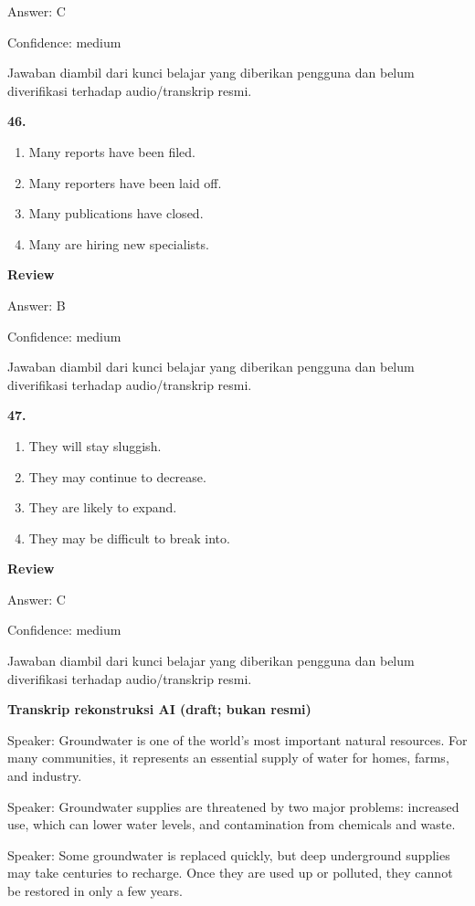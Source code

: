 \documentclass[12pt]{article}
\begin{document}
Answer: C\par
Confidence: medium\par
Jawaban diambil dari kunci belajar yang diberikan pengguna dan belum diverifikasi terhadap audio/transkrip resmi.\par
\endgroup
\par
\vspace{0.25\baselineskip}
\noindent\textbf{46.}
\begin{enumerate}[label=(\Alph*),leftmargin=*,itemsep=0.2em]
\item Many reports have been filed.
\item Many reporters have been laid off.
\item Many publications have closed.
\item Many are hiring new specialists.
\end{enumerate}
\par
\begingroup
\setlength{\parskip}{0pt}
\setlength{\parindent}{0pt}
\textbf{Review}\par
Answer: B\par
Confidence: medium\par
Jawaban diambil dari kunci belajar yang diberikan pengguna dan belum diverifikasi terhadap audio/transkrip resmi.\par
\endgroup
\par
\vspace{0.25\baselineskip}
\noindent\textbf{47.}
\begin{enumerate}[label=(\Alph*),leftmargin=*,itemsep=0.2em]
\item They will stay sluggish.
\item They may continue to decrease.
\item They are likely to expand.
\item They may be difficult to break into.
\end{enumerate}
\par
\begingroup
\setlength{\parskip}{0pt}
\setlength{\parindent}{0pt}
\textbf{Review}\par
Answer: C\par
Confidence: medium\par
Jawaban diambil dari kunci belajar yang diberikan pengguna dan belum diverifikasi terhadap audio/transkrip resmi.\par
\endgroup
\par
\vspace{0.25\baselineskip}
\begin{exampleblock}
\textbf{Transkrip rekonstruksi AI (draft; bukan resmi)}\par
Speaker: Groundwater is one of the world's most important natural resources. For many communities, it represents an essential supply of water for homes, farms, and industry.\par
Speaker: Groundwater supplies are threatened by two major problems: increased use, which can lower water levels, and contamination from chemicals and waste.\par
Speaker: Some groundwater is replaced quickly, but deep underground supplies may take centuries to recharge. Once they are used up or polluted, they cannot be restored in only a few years.\par
\end{exampleblock}
\end{document}
